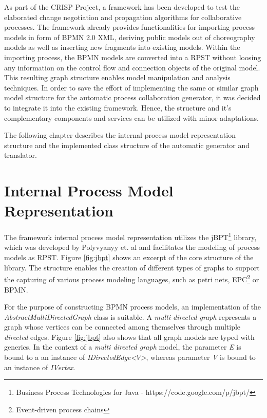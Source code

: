 As part of the CRISP Project, a framework has been developed to test the elaborated change negotiation and propagation algorithms for collaborative processes. The framework already provides functionalities for importing process models in form of BPMN 2.0 XML, deriving public models out of choreography models as well as inserting new fragments into existing models. Within the importing process, the BPMN models are converted into a RPST without loosing any information on the control flow and connection objects of the original model. This resulting graph structure enables model manipulation and analysis techniques. In order to save the effort of implementing the same or similar graph model structure for the automatic process collaboration generator, it was decided to integrate it into the existing framework. Hence, the structure and it's complementary components and services can be utilized with minor adaptations.\par
The following chapter describes the internal process model representation structure and the implemented class structure of the automatic generator and translator.

\section{Internal Process Model Representation}
The framework internal process model representation utilizes the jBPT\footnote{Business Process Technologies for Java - https://code.google.com/p/jbpt/} library, which was developed by Polyvyanyy et. al \cite{jbpt} and facilitates the modeling of process models as RPST. Figure \ref{fig:jbpt} shows an excerpt of the core structure of the library. The structure enables the creation of different types of graphs to support the capturing of various process modeling languages, such as petri nets, EPC\footnote{Event-driven process chains} or BPMN.\par
For the purpose of constructing BPMN process models, an implementation of the \textit{AbstractMultiDirectedGraph} class is suitable. A \textit{multi directed graph} represents a graph whose vertices can be connected among themselves through multiple \textit{directed} edges\cite{graph_theory}. Figure \ref{fig:jbpt} also shows that all graph models are typed with generics. In the context of a \textit{multi directed graph} model, the parameter \textit{E} is bound to a an instance of \textit{IDirectedEdge\textless$V$\textgreater}, whereas parameter \textit{V} is bound to an instance of \textit{IVertex}. 

